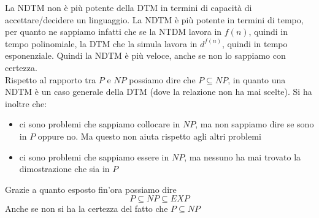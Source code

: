 La NDTM non è più potente della DTM in termini di capacità di accettare/decidere un linguaggio. La NDTM è più potente in termini di tempo, per quanto ne sappiamo infatti che se la NTDM lavora in $f(n)$, quindi in tempo polinomiale, la DTM che la simula lavora in $d^{f(n)}$, quindi in tempo esponenziale. Quindi la NDTM è più veloce, anche se non lo sappiamo con certezza.\\ 
Rispetto al rapporto tra $P$ e $NP$ possiamo dire che $P\subseteq NP$, in quanto una NDTM è un caso generale della DTM (dove la relazione non ha mai scelte). Si ha inoltre che:
\begin{itemize}
  \item ci sono problemi che sappiamo collocare in $NP$, ma non sappiamo dire se sono in $P$ oppure no. Ma questo non aiuta rispetto agli
  altri problemi
  \item ci sono problemi che sappiamo essere in $NP$, ma nessuno ha mai trovato la dimostrazione che sia in $P$
\end{itemize}
Grazie a quanto esposto fin'ora possiamo dire \[P\subseteq NP \subseteq EXP\]
Anche se non si ha la certezza del fatto che $P\subseteq NP$